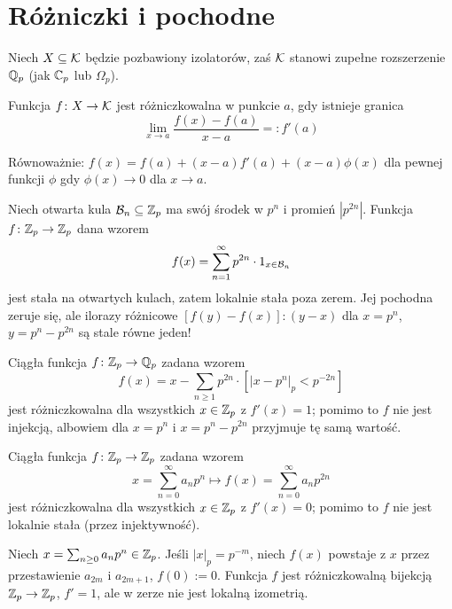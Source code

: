 \section{Różniczki i pochodne}
Niech  $X \subseteq \mathcal K$ będzie pozbawiony izolatorów, zaś $\mathcal K$ stanowi zupełne rozszerzenie $\mathbb Q_p$ (jak $\mathbb C_p$ lub $\Omega_p$).

\begin{definicja}
	Funkcja $f \colon X \to \mathcal K$ jest różniczkowalna w punkcie $a$, gdy istnieje granica
	\[
		\lim_{x \to a} \frac{f(x) - f(a)}{x-a} =: f'(a)
	\]
\end{definicja}

Równoważnie: $f(x) = f(a) + (x-a) f'(a) + (x-a) \phi(x)$ dla pewnej funkcji $\phi$ gdy $\phi(x) \to 0$ dla $x \to a$.

\begin{przyklad}
	Niech otwarta kula $\mathcal B_n \subseteq \mathbb Z_p$ ma swój środek w $p^n$ i promień $|p^{2n}|$.
	Funkcja $f \colon \mathbb Z_p \to \mathbb Z_p$ dana wzorem
	\[
		f(x) = \sum_{n=1}^\infty p^{2n} \cdot 1_{x \in \mathcal B_n}
	\]
	jest stała na otwartych kulach, zatem lokalnie stała poza zerem.
	Jej pochodna zeruje się, ale ilorazy różnicowe $[f(y) - f(x)]:(y - x)$ dla $x = p^n$, $y = p^n - p^{2n}$ są stale równe jeden!
\end{przyklad}

\begin{przyklad}
	Ciągła funkcja $f \colon \mathbb Z_p \to \mathbb Q_p$ zadana wzorem
	\[
		f(x) = x - \sum_{n \ge 1} p^{2n} \cdot [|x - p^n|_p < p^{-2n}]
	\]
	jest różniczkowalna dla wszystkich $x \in \mathbb Z_p$ z $f'(x) = 1$; pomimo to $f$ nie jest injekcją, albowiem dla $x = p^n$ i $x = p^n - p^{2n}$ przyjmuje tę samą wartość.
\end{przyklad}

\begin{przyklad}
	Ciągła funkcja $f \colon \mathbb Z_p \to \mathbb Z_p$ zadana wzorem
	\[
		x = \sum_{n=0}^\infty a_n p^n \mapsto f(x) = \sum_{n=0}^\infty a_n p^{2n}
	\]
	jest różniczkowalna dla wszystkich $x \in \mathbb Z_p$ z $f'(x) = 0$; pomimo to $f$ nie jest lokalnie stała (przez injektywność).
\end{przyklad}

\begin{przyklad}
	Niech $x = \sum_{n \ge 0} a_n p^n \in \mathbb Z_p$.
	Jeśli $|x|_p = p^{-m}$, niech $f(x)$ powstaje z $x$ przez przestawienie $a_{2m}$ i $a_{2m+1}$, $f(0) := 0$.
	Funkcja $f$ jest różniczkowalną bijekcją $\mathbb Z_p \to\mathbb Z_p$, $f' = 1$, ale w zerze nie jest lokalną izometrią.
\end{przyklad}

